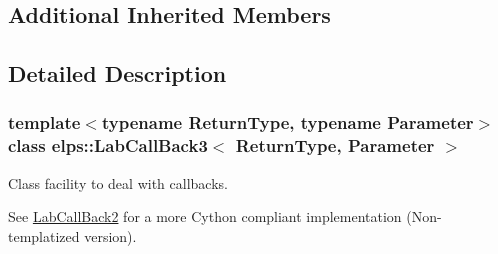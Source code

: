 \subsection*{Additional Inherited Members}


\subsection{Detailed Description}
\subsubsection*{template$<$typename Return\-Type, typename Parameter$>$class elps\-::\-Lab\-Call\-Back3$<$ Return\-Type, Parameter $>$}

Class facility to deal with callbacks.

See \hyperlink{classelps_1_1_lab_call_back2}{Lab\-Call\-Back2} for a more Cython compliant implementation (Non-\/templatized version). 

